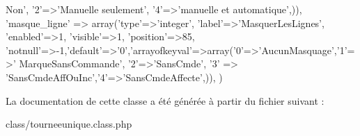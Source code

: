 \begin{DoxyCode}
{      Non'}, \textcolor{charliteral}{'2'}=>\textcolor{stringliteral}{'Manuelle seulement'}, \textcolor{charliteral}{'4'}=>\textcolor{stringliteral}{'manuelle et automatique'},)),
        \textcolor{stringliteral}{'masque\_ligne'} => array(\textcolor{stringliteral}{'type'}=>\textcolor{stringliteral}{'integer'}, \textcolor{stringliteral}{'label'}=>\textcolor{stringliteral}{'MasquerLesLignes'}, \textcolor{stringliteral}{'enabled'}=>1, \textcolor{stringliteral}{'visible'}=>1,
       \textcolor{stringliteral}{'position'}=>85, \textcolor{stringliteral}{'notnull'}=>-1,\textcolor{stringliteral}{'default'}=>\textcolor{charliteral}{'0'},\textcolor{stringliteral}{'arrayofkeyval'}=>array(\textcolor{charliteral}{'0'}=>\textcolor{stringliteral}{'AucunMasquage'},\textcolor{charliteral}{'1'}=>\textcolor{stringliteral}{'
      MarqueSansCommande'}, \textcolor{charliteral}{'2'}=>\textcolor{stringliteral}{'SansCmde'}, \textcolor{charliteral}{'3'} => \textcolor{stringliteral}{'SansCmdeAffOuInc'},\textcolor{charliteral}{'4'}=>\textcolor{stringliteral}{'SansCmdeAffecte'},)),
    )
\end{DoxyCode}


La documentation de cette classe a été générée à partir du fichier suivant \+:\begin{DoxyCompactItemize}
\item 
class/tourneeunique.\+class.\+php\end{DoxyCompactItemize}
